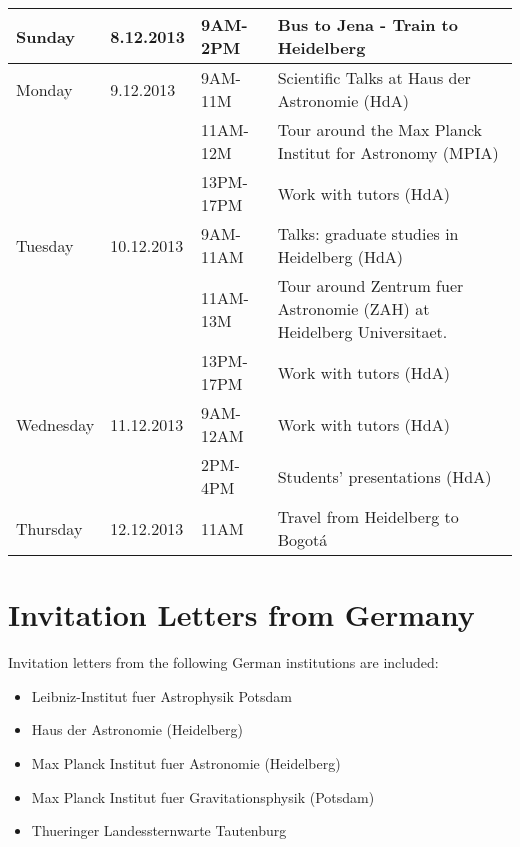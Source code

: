\documentclass[12pt]{article}
\begin{document}
\begin{tabular}{p{2cm}p{2cm}p{2.5cm}p{7.0cm}}
Sunday &8.12.2013& 9AM-2PM & Bus to Jena - Train to Heidelberg\\\hline

Monday &9.12.2013  & 9AM-11M & Scientific Talks at Haus der
Astronomie (HdA)\\ 
&  & 11AM-12M  & Tour around the Max Planck Institut for Astronomy (MPIA)\\
 & & 13PM-17PM & Work with tutors (HdA)\\\hline

Tuesday &10.12.2013  & 9AM-11AM & Talks: graduate studies in Heidelberg (HdA)\\
& & 11AM-13M & Tour around Zentrum fuer Astronomie (ZAH) at Heidelberg Universitaet.\\
 & & 13PM-17PM & Work with tutors (HdA)\\\hline

Wednesday &11.12.2013 & 9AM-12AM	&Work with tutors (HdA)\\
& & 2PM-4PM  & Students' presentations (HdA)\\\hline

Thursday &12.12.2013&11AM	& Travel from Heidelberg to Bogot\'a\\\hline\hline
\end{tabular}



\section{Invitation Letters from Germany}
Invitation letters from the following German institutions are included:

\begin{itemize}
\item Leibniz-Institut fuer Astrophysik Potsdam
\item Haus der Astronomie (Heidelberg)
\item Max Planck Institut fuer Astronomie (Heidelberg)
\item Max Planck Institut fuer Gravitationsphysik (Potsdam)
\item Thueringer Landessternwarte Tautenburg
\end{itemize}

\newpage
\end{document}
